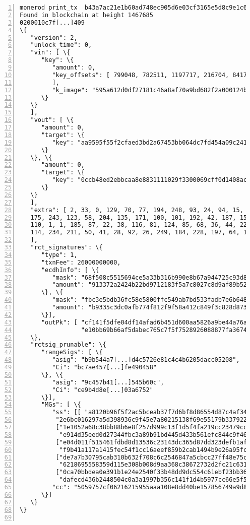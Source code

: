 \begin{appendices}
\begin{Verbatim}[commandchars=\\\{\}, numbers=left]
monerod print_tx  b43a7ac21e1b60ad748ec905d6e03cf3165e5d8c9e1c61c263d328118c42eaa6 
Found in blockchain at height 1467685
0200010c7f[...]409
\{
   "version": 2,
   "unlock_time": 0, 
   "vin": [ \{
      "key": \{
         "amount": 0, 
         "key_offsets": [ 799048, 782511, 1197717, 216704, 841722
         ], 
         "k_image": "595a612d0df27181c46a8af70a9bd682f2a000124b873ba5d2b9f4b4e4efd672"
      \}
   \}
   ], 
   "vout": [ \{
      "amount": 0, 
      "target": \{
         "key": "aa9595f55f2cfaed3bd2a67453bb064dc7fd454a09c2418d7338782790185fe3"
      \}
   \}, \{
      "amount": 0, 
      "target": \{
         "key": "0ccb48ed2ebbcaa8e8831111029f3300069cff0d1408acffbfc3810b362ea217"
      \}
   \}
   ], 
   "extra": [ 2, 33, 0, 129, 70, 77, 194, 248, 93, 24, 94, 15, 107, 233, 0, 229, 82, 
   175, 243, 123, 58, 204, 135, 171, 100, 101, 192, 42, 187, 157, 168, 222, 98, 192, 
   110, 1, 1, 185, 87, 22, 38, 116, 81, 124, 85, 68, 36, 44, 229, 235, 46, 159, 139, 
   114, 234, 211, 50, 41, 28, 92, 26, 249, 184, 228, 197, 64, 139, 5
   ], 
   "rct_signatures": \{
      "type": 1, 
      "txnFee": 26000000000, 
      "ecdhInfo": [ \{
         "mask": "68f508c5515694ce5a33b316b990e8b67a944725c93d806767e61b2e0b13d300", 
         "amount": "913372a2424b22bd9712183f5a7c8027c8d9af89b52d1e7d06fd1f87a1e5d20d"
      \}, \{
         "mask": "fbc3e5bdb36fc58e5800ffc549ab7bd533fadb7e6b64898c82ea620d749fc80e", 
         "amount": "b9335c3dc0afb774f812f9f58a412c849f3c828d873f1c16ab102963799d9809"
      \}], 
      "outPk": [ "cf141f5dfe04df14afad6b451d600aa5826a9be44a76a1630850c1d5951d482e",
                 "e10bb69b66af5dabec765c7f5f7528926088877fa36746833828a0575896ae57"]
   \}, 
   "rctsig_prunable": \{
      "rangeSigs": [ \{
         "asig": "b9b544a7[...]d4c5726e81c4c4b6205dacc05208", 
         "Ci": "bc7ae457[...]fe490458"
      \}, \{
         "asig": "9c457b41[...]545b60c", 
         "Ci": "ce9b4d8e[...]03a6752"
      \}], 
      "MGs": [ \{
         "ss": [[ "a8120b96f5f2ac5bceab37f7d6bf8d86554d87c4af3441007cad92f54a24d908",
          "2e6bc016297a5d398936c9f45e7a80215138f69e55179b337922e2d51c1a9f00"], 
          ["1e1052a68c38bb88b6e8f257d999c13f1d5f4fa219cc23479ccbfa6b14b5960a",
           "e914d35eed0d27344fbc3a89b91bd445d433b561efc844c9f466a61ebb5f6d09"], 
          ["e04d011f515461fdbd8d13536c23143dc365d87dd323defb1af834e540a8fc0e",
           "f9b41a117a1415fec54f1cc16aeef859b2cab1494b9e26a95fc9eaf4f571fa00"], 
          ["de7a7b30795cab310b632f708c6c2546847a5cbcc27ff48e75c1556c3f6f180c",
           "6218695558359d115e308b008d9aa368c38672732d2fc21c6317ad7d15918c05"], 
          ["0ca70bbdea0e391b1e24e2540f33b48dd9dc554c61ebf23bb3691aab5094e40f",
           "dafecd436b2448504c0a3a1997b356c141f1d4b5977cc66e5f55592f13731501"]],        
         "cc": "5059757cf06216215955aaa108e8dd40be157856749a9d883bcac611e395a409"
      \}]
   \}
\}


\end{Verbatim}
\end{appendices}
